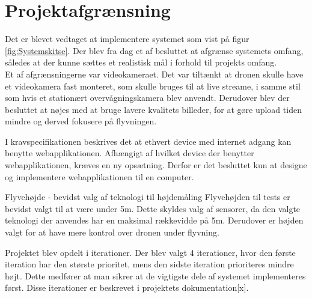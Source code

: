\chapter{Projektafgrænsning}

Det er blevet vedtaget at implementere systemet som vist på figur \ref{fig:Systemskitse}.
Der blev fra dag et af besluttet at afgrænse systemets omfang, således at der kunne sættes et realistisk mål i forhold til projekts omfang. \\

Et af afgrænsningerne var videokameraet. Det var tiltænkt at dronen skulle have et videokamera fast monteret, som skulle bruges til at live streame, i samme stil som hvis et stationært overvågningskamera blev anvendt.
Derudover blev der besluttet at nøjes med at bruge lavere kvalitets billeder, for  at gøre upload tiden mindre og derved fokusere på flyvningen.

I kravspecifikationen beskrives det at ethvert device med internet adgang kan benytte webapplikationen. Afhængigt af hvilket device der benytter webapplikationen, kræves en ny opsætning. Derfor er det besluttet kun at designe og implementere webapplikationen til en computer.

Flyvehøjde - bevidst valg af teknologi til højdemåling
Flyvehøjden til tests er bevidst valgt til at være under 5m. Dette skyldes valg af sensorer, da den valgte teknologi der anvendes har en maksimal rækkevidde på 5m. Derudover er højden valgt for at have mere kontrol over dronen under flyvning. 

Projektet blev opdelt i iterationer. Der blev valgt 4 iterationer, hvor den første iteration har den største prioritet, mens den sidste iteration prioriteres mindre højt. Dette medfører at man sikrer at de vigtigste dele af systemet implementeres først. Disse iterationer er beskrevet i projektets dokumentation[x].
